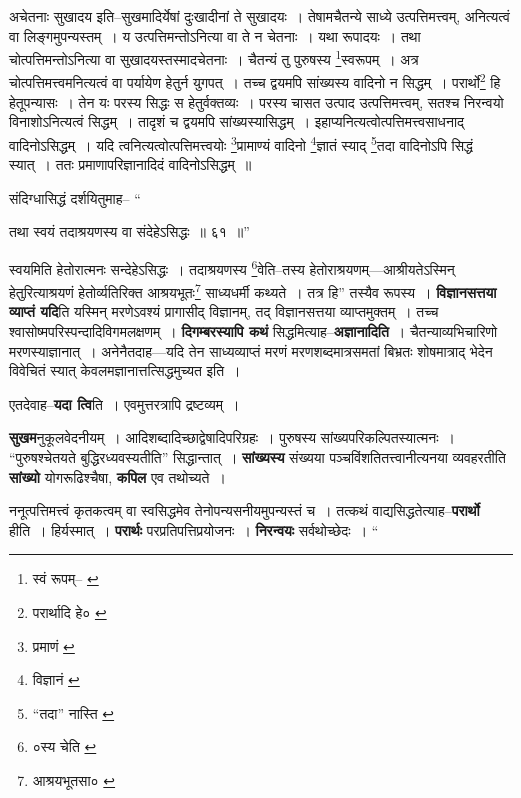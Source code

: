 \documentclass[article,12pt,a4paper]{memoir}
\begin{document}
	अचेतनाः सुखादय इति--सुखमादिर्येषां दुःखादीनां ते सुखादयः । तेषामचैतन्ये साध्ये उत्पत्तिमत्त्वम्, अनित्यत्वं वा लिङ्गमुपन्यस्तम् । य उत्पत्तिमन्तोऽनित्या वा ते न चेतनाः । यथा रूपादयः । तथा चोत्पत्तिमन्तोऽनित्या वा सुखादयस्तस्मादचेतनाः । चैतन्यं तु पुरुषस्य \footnote{स्वं रूपम्--\cite{dp-msA} \cite{dp-msB} \cite{dp-edP} \cite{dp-edH} \cite{dp-edN}}स्वरूपम् । अत्र चोत्पत्तिमत्त्वमनित्यत्वं वा पर्यायेण हेतुर्न युगपत् । तच्च द्वयमपि सांख्यस्य वादिनो न सिद्धम् । परार्थो\footnote{परार्थादि हे० \cite{dp-msB}} हि हेतूपन्यासः । तेन यः परस्य सिद्धः स हेतुर्वक्तव्यः । परस्य चासत उत्पाद उत्पत्तिमत्त्वम्, सतश्च निरन्वयो विनाशोऽनित्यत्वं सिद्धम् । तादृशं च द्वयमपि सांख्यस्यासिद्धम् । इहाप्यनित्यत्वोत्पत्तिमत्त्वसाधनाद् वादिनोऽसिद्धम् । यदि त्वनित्यत्वोत्पत्तिमत्त्वयोः \footnote{प्रमाणं \cite{dp-msA} \cite{dp-msC} \cite{dp-edP} \cite{dp-edH} \cite{dp-edE} \cite{dp-edN}}प्रामाण्यं वादिनो \footnote{विज्ञानं \cite{dp-msC}}ज्ञातं स्याद् \footnote{“तदा” नास्ति \cite{dp-msA} \cite{dp-edP} \cite{dp-edH} \cite{dp-edE} \cite{dp-edN}}तदा वादिनोऽपि सिद्धं स्यात् । ततः प्रमाणापरिज्ञानादिदं वादिनोऽसिद्धम् ॥ 
	  
	संदिग्धासिद्धं दर्शयितुमाह-- “
	  
	तथा स्वयं तदाश्रयणस्य वा संदेहेऽसिद्धः ॥ ६१ ॥” 
	  
	स्वयमिति हेतोरात्मनः सन्देहेऽसिद्धः । तदाश्रयणस्य \footnote{०स्य चेति \cite{dp-msA} \cite{dp-msB} \cite{dp-msC} \cite{dp-msD} \cite{dp-edP} \cite{dp-edH} \cite{dp-edE}}वेति--तस्य हेतोराश्रयणम्—आश्रीयतेऽस्मिन् हेतुरित्याश्रयणं हेतोर्व्यतिरिक्त आश्रयभूतः\footnote{आश्रयभूतसा० \cite{dp-edE}} साध्यधर्मी कथ्यते । तत्र हि” तस्यैव रूपस्य । \textbf{विज्ञानसत्तया व्याप्तं यदि}ति यस्मिन् मरणेऽवश्यं प्रागासीद् विज्ञानम्, तद् विज्ञानसत्तया व्याप्तमुक्तम् । तच्च श्वासोष्मपरिस्पन्दादिविगमलक्षणम् । \textbf{दिगम्बरस्यापि कथं} सिद्धमित्याह--\textbf{अज्ञानादिति} । चैतन्याव्यभिचारिणो मरणस्याज्ञानात् । अनेनैतदाह—यदि तेन साध्यव्याप्तं मरणं मरणशब्दमात्रसमतां बिभ्रतः शोषमात्राद् भेदेन विवेचितं स्यात् केवलमज्ञानात्तत्सिद्धमुच्यत इति ।
	\pend
      

	  \pstart एतदेवाह--\textbf{यदा त्वि}ति । एवमुत्तरत्रापि द्रष्टव्यम् ।
	\pend
      

	  \pstart \textbf{सुखम}नुकूलवेदनीयम् । आदिशब्दादिच्छाद्वेषादिपरिग्रहः । पुरुषस्य सांख्यपरिकल्पितस्यात्मनः । “पुरुषश्चेतयते बुद्धिरध्यवस्यतीति” सिद्धान्तात् । \textbf{सांख्यस्य} संख्यया पञ्चविंशतितत्त्वानीत्यनया व्यवहरतीति \textbf{सांख्यो} योगरूढिश्चैषा, \textbf{कपिल} एव तथोच्यते ।
	\pend
      

	  \pstart ननूत्पत्तिमत्त्वं कृतकत्वम् वा स्वसिद्धमेव तेनोपन्यसनीयमुपन्यस्तं च । तत्कथं वाद्यसिद्धतेत्याह--\textbf{परार्थो} हीति । हिर्यस्मात् । \textbf{परार्थः} परप्रतिपत्तिप्रयोजनः । \textbf{निरन्वयः} सर्वथोच्छेदः ।  \leavevmode{} “
	  
\end{document}
